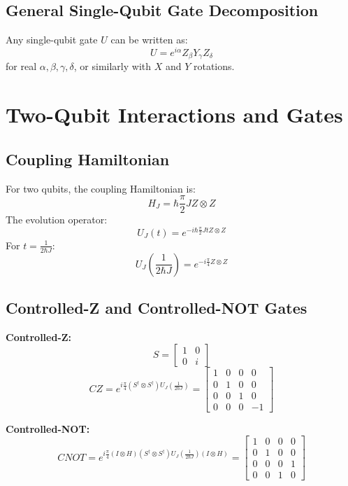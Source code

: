 \documentclass{book}
\begin{document}
\subsection*{General Single-Qubit Gate Decomposition}
Any single-qubit gate $U$ can be written as:
\[
U = e^{i\alpha} Z_\beta Y_\gamma Z_\delta
\]
for real $\alpha, \beta, \gamma, \delta$, or similarly with $X$ and $Y$ rotations.

\section{Two-Qubit Interactions and Gates}

\subsection*{Coupling Hamiltonian}
For two qubits, the coupling Hamiltonian is:
\[
H_J = \hbar \frac{\pi}{2} J Z \otimes Z
\]
The evolution operator:
\[
U_J(t) = e^{-i\hbar \frac{\pi}{2} J t Z \otimes Z}
\]
For $t = \frac{1}{2\hbar J}$:
\[
U_J\left(\frac{1}{2\hbar J}\right) = e^{-i\frac{\pi}{4} Z \otimes Z}
\]

\subsection*{Controlled-Z and Controlled-NOT Gates}
\textbf{Controlled-Z:}
\[
S = \begin{bmatrix} 1 & 0 \\ 0 & i \end{bmatrix}
\]
\[
CZ = e^{i\frac{\pi}{4}(S^\dagger \otimes S^\dagger) U_J\left(\frac{1}{2\hbar J}\right)} =
\begin{bmatrix}
1 & 0 & 0 & 0 \\
0 & 1 & 0 & 0 \\
0 & 0 & 1 & 0 \\
0 & 0 & 0 & -1
\end{bmatrix}
\]

\textbf{Controlled-NOT:}
\[
CNOT = e^{i\frac{\pi}{4}(I \otimes H)(S^\dagger \otimes S^\dagger) U_J\left(\frac{1}{2\hbar J}\right)(I \otimes H)} =
\begin{bmatrix}
1 & 0 & 0 & 0 \\
0 & 1 & 0 & 0 \\
0 & 0 & 0 & 1 \\
0 & 0 & 1 & 0
\end{bmatrix}
\]
\end{document}
